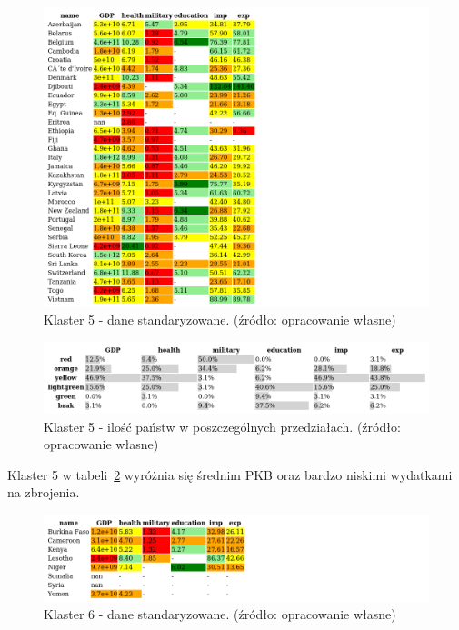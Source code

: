 \documentclass[11pt]{report}
\begin{document}
    
    \begin{figure}[!htp]
        \centering
        \includegraphics[width=1 \textwidth]{tables/CLUST/cluster5stdkmeans.png}
        \caption{Klaster 5 - dane standaryzowane. (źródło: opracowanie własne)}
        \label{tab:cl5std}
    \end{figure}

    \begin{figure}[!htp]
        \centering
        \includegraphics[width=1 \textwidth]{tables/CLUST/cluster5stdkmeanscount.png}
        \caption{Klaster 5 - ilość państw w poszczególnych przedziałach. (źródło: opracowanie własne)}
        \label{tab:cl5stdcount}
    \end{figure}

    Klaster 5 w tabeli~\ref{tab:cl5stdcount} wyróżnia się średnim PKB oraz bardzo niskimi wydatkami na zbrojenia.

    

    \begin{figure}[!htp]
        \centering
        \includegraphics[width=1 \textwidth]{tables/CLUST/cluster6stdkmeans.png}
        \caption{Klaster 6 - dane standaryzowane. (źródło: opracowanie własne)}
        \label{tab:cl6std}
    \end{figure}
\end{document}
